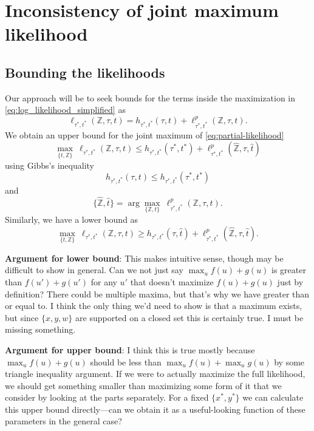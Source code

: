 \documentclass[a4paper]{article}
\newcommand{\fullAncestralStateCategories}{\mathbb{Z}}
\begin{document}
\section{Inconsistency of joint maximum likelihood}

\subsection{Bounding the likelihoods}

Our approach will be to seek bounds for the terms inside the maximization in \eqref{eq:log_likelihood_simplified} as
\begin{equation}
\label{eq:partial-likelihood}
\ell_{\tau^*,t^*}(\fullAncestralStateCategories,\tau,t) = h_{\tau^*,t^*}(\tau,t) + \ell^p_{\tau^*,t^*}(\fullAncestralStateCategories,\tau,t).
\end{equation}
We obtain an upper bound for the joint maximum of \eqref{eq:partial-likelihood}
$$
\max_{\{t,\fullAncestralStateCategories\}} \ \ell_{\tau^*,t^*}(\fullAncestralStateCategories,\tau,t) \le
    h_{\tau^*,t^*}(\tau^*,t^*)
    + \ell^p_{\tau^*,t^*}(\hat{\fullAncestralStateCategories},\tau,\hat{t})
$$
using Gibbs's inequality
$$
h_{\tau^*,t^*}(\tau,t) \le h_{\tau^*,t^*}(\tau^*,t^*)
$$
and
$$
\{\hat{\fullAncestralStateCategories},\hat{t}\} = \arg\max_{\{\fullAncestralStateCategories,t\}} \ \ell^p_{\tau^*,t^*}(\fullAncestralStateCategories,\tau,t).
$$
Similarly, we have a lower bound as
$$
\max_{\{t,\fullAncestralStateCategories\}} \ \ell_{\tau^*,t^*}(\fullAncestralStateCategories,\tau,t) \ge
    h_{\tau^*,t^*}(\tau,\hat{t})
    + \ell^p_{\tau^*,t^*}(\hat{\fullAncestralStateCategories},\tau,\hat{t}).
$$

\textbf{Argument for lower bound}: This makes intuitive sense, though may be difficult to show in general.
Can we not just say $\max_u f(u) + g(u)$ is greater than $f(u') + g(u')$ for any $u'$ that doesn't maximize $f(u) + g(u)$ just by definition?
There could be multiple maxima, but that's why we have greater than or equal to.
I think the only thing we'd need to show is that a maximum exists, but since $\{x,y,w\}$ are supported on a closed set this is certainly true.
I must be missing something.

\textbf{Argument for upper bound}: I think this is true mostly because $\max_u f(u) + g(u)$ should be less than $\max_u f(u) + \max_u g(u)$ by some triangle inequality argument.
If we were to actually maximize the full likelihood, we should get something smaller than maximizing some form of it that we consider by looking at the parts separately.
For a fixed $\{x^*, y^*\}$ we can calculate this upper bound directly---can we obtain it as a useful-looking function of these parameters in the general case?
\end{document}
